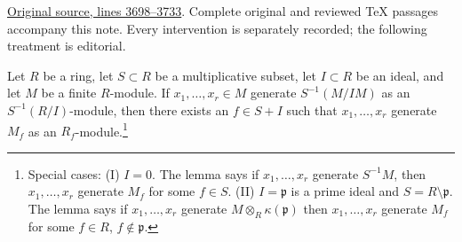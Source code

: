 \hypertarget{algebra-context-018}{}

\noindent\href{https://github.com/stacks/stacks-project/blob/a04446e57ec1fbc252a871afcec7752fb2807b14/algebra.tex\#L3698}{Original source, lines 3698--3733}. Complete original and reviewed TeX passages accompany this note. Every intervention is separately recorded; the following treatment is editorial.


\begin{lemma}
\label{editorial-source-lemma-NAK-localization}
Let $R$ be a ring, let $S \subset R$ be a multiplicative subset,
let $I \subset R$ be an ideal, and let $M$ be a finite $R$-module.
If $x_1, \ldots, x_r \in M$ generate $S^{-1}(M/IM)$
as an $S^{-1}(R/I)$-module, then there exists an $f \in S + I$
such that $x_1, \ldots, x_r$ generate $M_f$ as an
$R_f$-module.\footnote{Special cases: (I) $I = 0$. The lemma says
if $x_1, \ldots, x_r$ generate $S^{-1}M$, then $x_1, \ldots, x_r$
generate $M_f$ for some $f \in S$. (II) $I = \mathfrak p$ is
a prime ideal and $S = R \setminus \mathfrak p$. The lemma says if
$x_1, \ldots, x_r$ generate $M \otimes_R \kappa(\mathfrak p)$
then $x_1, \ldots, x_r$ generate $M_f$ for some
$f \in R$, $f \not \in \mathfrak p$.}
\end{lemma}

